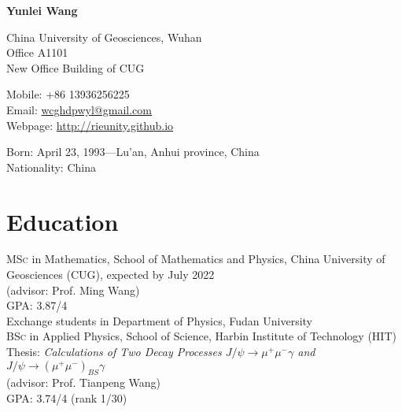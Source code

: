 \documentclass[11pt]{article} %
\begin{document}

{\LARGE\bfseries Yunlei Wang} %
\bigskip\bigskip\medskip %

China University of Geosciences, Wuhan\\ %
Office A1101\\ New Office Building of CUG

\vspace{0.01\textheight} 

Mobile: +86 13936256225\\ %
Email: \href{wcghdpwyl@gmail.com}{wcghdpwyl@gmail.com}\\ %
Webpage: \href{http://rieunity.github.io}{http://rieunity.github.io}%

\vspace{0.01\textheight} %


Born: April 23, 1993---Lu'an, Anhui province, China\\ %
Nationality: China %


\section*{Education}

\textsc{MSc} in Mathematics, School of Mathematics and Physics, China University of Geosciences (CUG), expected by July 2022\\
(advisor: Prof. Ming Wang)\\
GPA: 3.87/4 \\
 Exchange students in Department of Physics,  Fudan University\\
\textsc{BSc} in Applied Physics, School of Science, Harbin Institute of Technology (HIT)\\
Thesis: \emph{Calculations of Two Decay Processes $J /\psi \to \mu^+\mu^-\gamma$ and $J /\psi \to (\mu^+\mu^-)_{BS}\gamma$} \\
(advisor: Prof. Tianpeng Wang) \\
GPA: 3.74/4 (rank 1/30)
\end{document}

